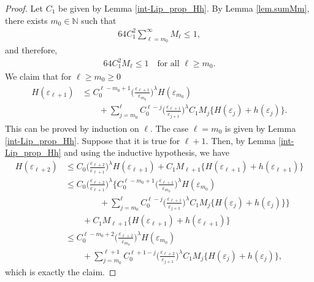 \documentclass[10pt,a4paper]{amsart}
\newcommand{\N}{\mathbb{N}}
\begin{document}
\begin{proof}
Let $C_1$ be given by Lemma \ref{int-Lip_prop_Hh}. By Lemma \ref{lem.sumMm}, there exists $m_0 \in \N$ such that
\begin{align}\label{int-Lip_es_M_remainder}
    64C_1^2\sum_{\ell=m_0}^\infty M_\ell\leq 1,
\end{align}
and therefore,
\begin{align}\label{int-Lip_property_Mj}
    64C_1^2 M_\ell\leq 1\quad \text{for all }\ell \geq m_0.
\end{align}
We claim that for $\ell\geq m_0 \geq 0$
  \begin{align}\label{int-Lip_H_claim}
    \begin{split}
      H(\varepsilon_{\ell+1}) & \leq C_0^{\ell-m_0+1}\Big(\frac{\varepsilon_{\ell+1}}{\varepsilon_{m_0}}\Big)^\lambda H(\varepsilon_{m_0})\\
      & \qquad+\sum_{j=m_0}^{\ell}C_0^{\ell-j}\Big(\frac{\varepsilon_{\ell+1}}{\varepsilon_{j+1}}\Big)^\lambda C_1M_j\{H(\varepsilon_j)+h(\varepsilon_j)\}.
    \end{split}
  \end{align}
  This can be proved by induction on $\ell$. The case $\ell=m_0$ is given by Lemma \ref{int-Lip_prop_Hh}. Suppose that it is true for $\ell+1$. Then, by Lemma \ref{int-Lip_prop_Hh} and using the inductive hypothesis, we have
  \begin{align*}
    H(\varepsilon_{\ell+2})&\leq C_0\Big(\frac{\varepsilon_{\ell+2}}{\varepsilon_{\ell+1}}\Big)^\lambda H(\varepsilon_{\ell+1})+C_1M_{\ell+1}\{H(\varepsilon_{\ell+1})+h(\varepsilon_{\ell+1})\}\\
    &\leq C_0\Big(\frac{\varepsilon_{\ell+2}}{\varepsilon_{\ell+1}}\Big)^\lambda \bigg\{C_0^{\ell-m_0+1}\Big(\frac{\varepsilon_{\ell+1}}{\varepsilon_{m_0}}\Big)^\lambda H(\varepsilon_{m_0})\\
    &\qquad \qquad+\sum_{j=m_0}^\ell C_0^{\ell-j}\Big(\frac{\varepsilon_{\ell+1}}{\varepsilon_{j+1}}\Big)^\lambda C_1M_j\big\{H(\varepsilon_j)+h(\varepsilon_j)\big\}\bigg\}\\
    &\qquad +C_1M_{\ell+1}\{H(\varepsilon_{\ell+1})+h(\varepsilon_{\ell+1})\}\\&\leq C_0^{\ell-m_0+2}\Big(\frac{\varepsilon_{\ell+2}}{\varepsilon_{m_0}}\Big)^\lambda H(\varepsilon_{m_0})\\&\qquad+\sum_{j=m_0}^{\ell+1} C_0^{\ell+1-j}\Big(\frac{\varepsilon_{\ell+2}}{\varepsilon_{j+1}}\Big)^\lambda C_1M_j\{H(\varepsilon_j)+h(\varepsilon_j)\},
  \end{align*}
  which is exactly the claim.


\end{proof}
\end{document}
